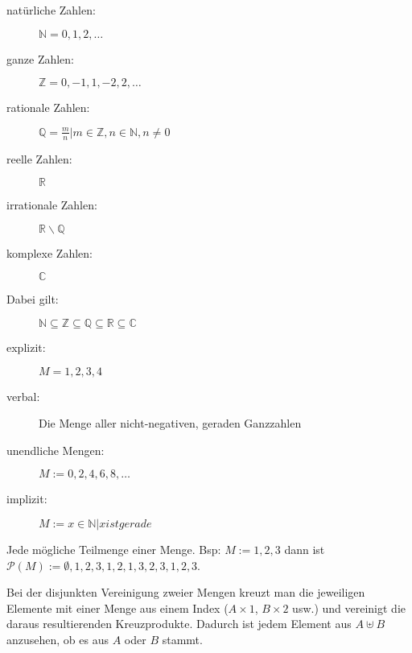 \begin{framed} [Zahlenmengen]
  \begin{description}
    \item [natürliche Zahlen:] $\mathbb{N} = {0,1,2,\dots}$
    \item [ganze Zahlen:] $\mathbb{Z} = {0,-1,1,-2,2,\dots}$
    \item [rationale Zahlen:] $\mathbb{Q} = {\frac{m}{n} | m \in \mathbb{Z}, n \in \mathbb{N}, n \neq 0}$
    \item [reelle Zahlen:] $\mathbb{R}$
    \item [irrationale Zahlen:] $\mathbb{R}\backslash \mathbb{Q}$
    \item [komplexe Zahlen:] $\mathbb{C}$
    \item [Dabei gilt:] $\mathbb{N} \subseteq \mathbb{Z} \subseteq \mathbb{Q} \subseteq \mathbb{R} \subseteq \mathbb{C}$
  \end{description}
\end{framed}

\vspace{-.6cm}

\begin{framed} 
  \begin{description}
    \item [explizit:] $M = {1,2,3,4}$
    \item [verbal:] \dq{}Die Menge aller nicht-negativen, geraden Ganzzahlen\dq{}
    \item [unendliche Mengen:] $M := {0,2,4,6,8,\dots}$
    \item [implizit:] $M := {x \in \mathbb{N} | x ist gerade}$
  \end{description}
\end{framed}

\vspace{-.6cm}

\begin{framed} [Potenzmenge:] 
  Jede mögliche Teilmenge einer Menge. Bsp: $M := {1,2,3}$ dann ist
  $\mathcal{P}(M) := {\emptyset},{1},{2},{3},{1,2},{1,3},{2,3},{1,2,3}$.
\end{framed}

\vspace{-.6cm}

\begin{framed}  
    Bei der disjunkten Vereinigung zweier Mengen kreuzt man die jeweiligen 
    Elemente mit einer Menge aus einem Index ($A \times {1}$, $B \times {2}$ usw.) 
    und vereinigt die daraus resultierenden Kreuzprodukte. 
    Dadurch ist jedem Element aus $A \uplus B$ anzusehen, ob es aus $A$ oder $B$ 
    stammt.
\end{framed}
